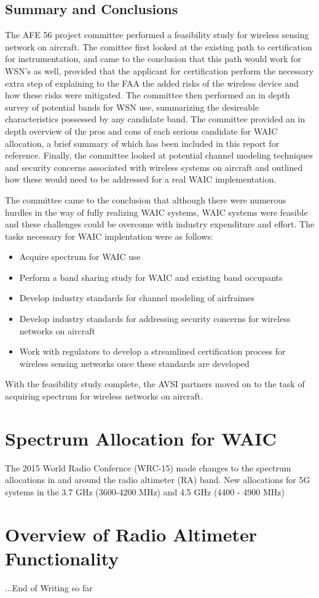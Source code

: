 \subsection{Summary and Conclusions}
The AFE 56 project committee performed a feasibility study for wireless sensing network on aircraft. The comittee first looked at the existing path to certification for instrumentation, and came to the conclusion that this path would work for WSN's as well, provided that the applicant for certification perform the necessary extra step of explaining to the FAA the added risks of the wireless device and how these risks were mitigated. The committee then performed an in depth survey of potential bands for WSN use, summarizing the desireable characteristics possessed by any candidate band. The committee provided an in depth overview of the pros and cons of each serious candidate for WAIC allocation, a brief summary of which has been included in this report for reference. Finally, the  committee looked at potential channel modeling techniques and security concerns associated with wireless systems on aircraft and outlined how these would need to be addressed for a real WAIC implementation. 

The committee came to the conclusion that although there were numerous hurdles in the way of fully realizing WAIC systems, WAIC systems were feasible and these challenges could be overcome with industry expenditure and effort. The tasks necessary for WAIC implentation were as follows: 
\begin{itemize}
\item Acquire spectrum for WAIC use
\item Perform a band sharing study for WAIC and existing band occupants
\item Develop industry standards for channel modeling of airfraimes
\item Develop industry standards for addressing security concerns for wireless networks on aircraft
\item Work with regulators to develop a streamlined certification process for wireless sensing networks once these standards are developed
\end{itemize}
 
 With the feasibility study complete, the AVSI partners moved on to the task of acquiring spectrum for wireless networks on aircraft. 
 
\section{Spectrum Allocation for WAIC}
The 2015 World Radio Confernce (WRC-15) made changes to the spectrum allocations in and around the radio altimeter (RA) band. New allocations for 5G systems in the 3.7 GHz (3600-4200 MHz) and 4.5 GHz (4400 - 4900 MHz)

\section{Overview of Radio Altimeter Functionality}


...End of Writing so far

